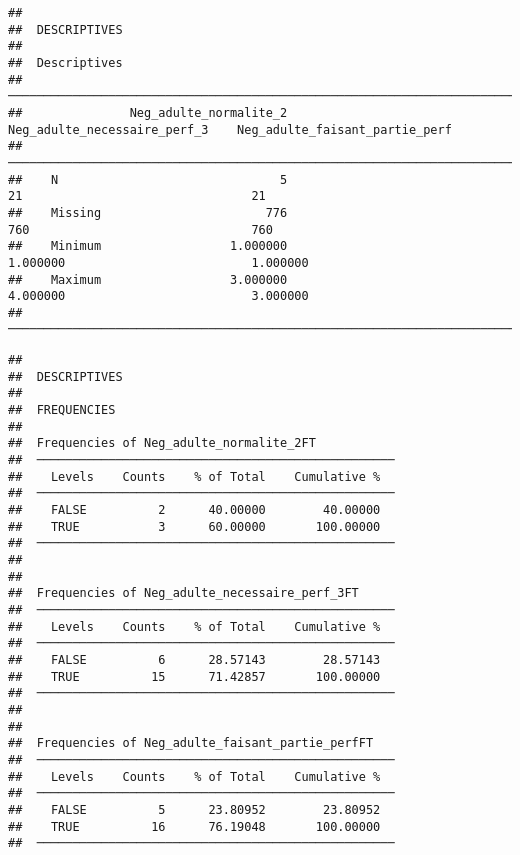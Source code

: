 \documentclass[
]{article}
\begin{document}
\begin{verbatim}
## 
##  DESCRIPTIVES
## 
##  Descriptives                                                                                            
##  ─────────────────────────────────────────────────────────────────────────────────────────────────────── 
##               Neg_adulte_normalite_2    Neg_adulte_necessaire_perf_3    Neg_adulte_faisant_partie_perf   
##  ─────────────────────────────────────────────────────────────────────────────────────────────────────── 
##    N                               5                              21                                21   
##    Missing                       776                             760                               760   
##    Minimum                  1.000000                        1.000000                          1.000000   
##    Maximum                  3.000000                        4.000000                          3.000000   
##  ───────────────────────────────────────────────────────────────────────────────────────────────────────
\end{verbatim}

\begin{verbatim}
## 
##  DESCRIPTIVES
## 
##  FREQUENCIES
## 
##  Frequencies of Neg_adulte_normalite_2FT            
##  ────────────────────────────────────────────────── 
##    Levels    Counts    % of Total    Cumulative %   
##  ────────────────────────────────────────────────── 
##    FALSE          2      40.00000        40.00000   
##    TRUE           3      60.00000       100.00000   
##  ────────────────────────────────────────────────── 
## 
## 
##  Frequencies of Neg_adulte_necessaire_perf_3FT      
##  ────────────────────────────────────────────────── 
##    Levels    Counts    % of Total    Cumulative %   
##  ────────────────────────────────────────────────── 
##    FALSE          6      28.57143        28.57143   
##    TRUE          15      71.42857       100.00000   
##  ────────────────────────────────────────────────── 
## 
## 
##  Frequencies of Neg_adulte_faisant_partie_perfFT    
##  ────────────────────────────────────────────────── 
##    Levels    Counts    % of Total    Cumulative %   
##  ────────────────────────────────────────────────── 
##    FALSE          5      23.80952        23.80952   
##    TRUE          16      76.19048       100.00000   
##  ──────────────────────────────────────────────────
\end{verbatim}
\end{document}
